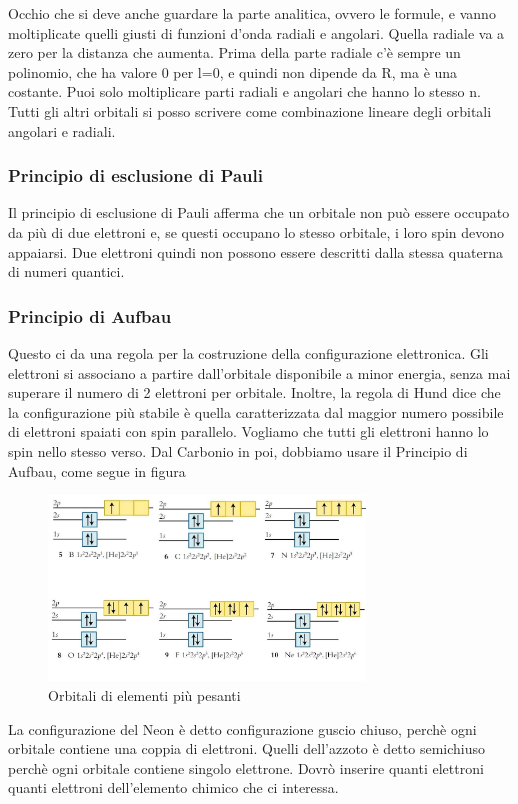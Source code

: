 \documentclass[a4paper]{article}
\begin{document}
Occhio che si deve anche guardare la parte analitica, ovvero le formule, e vanno moltiplicate quelli giusti di funzioni d'onda radiali e angolari. Quella radiale va a zero per la distanza che aumenta. Prima della parte radiale c'è sempre un polinomio, che ha valore 0 per l=0, e quindi non dipende da R, ma è una costante. Puoi solo moltiplicare parti radiali e angolari che hanno lo stesso n. Tutti gli altri orbitali si posso scrivere come combinazione lineare degli orbitali angolari e radiali. 

\subsubsection{Principio di esclusione di Pauli}
Il principio di esclusione di Pauli afferma che un orbitale non può essere occupato da più di due elettroni e, se questi occupano lo stesso orbitale, i loro spin devono appaiarsi. Due elettroni quindi non possono essere descritti dalla stessa quaterna di numeri quantici. 

\subsubsection{Principio di Aufbau}
Questo ci da una regola per la costruzione della configurazione elettronica. Gli elettroni si associano a partire dall'orbitale disponibile a minor energia, senza mai superare il numero di 2 elettroni per orbitale. Inoltre, la regola di Hund dice che la configurazione più stabile è quella caratterizzata dal maggior numero possibile di elettroni spaiati con spin parallelo. Vogliamo che tutti gli elettroni hanno lo spin nello stesso verso. Dal Carbonio in poi, dobbiamo usare il Principio di Aufbau, come segue in figura
\begin{figure}[!h]
    \centering
    \includegraphics[width=0.75\textwidth]{orbitali.png}
    \caption{Orbitali di elementi più pesanti}
\end{figure}
\FloatBarrier
La configurazione del Neon è detto configurazione guscio chiuso, perchè ogni orbitale contiene una coppia di elettroni. Quelli dell'azzoto è detto semichiuso perchè ogni orbitale contiene singolo elettrone. Dovrò inserire quanti elettroni quanti elettroni dell'elemento chimico che ci interessa.
\end{document}
